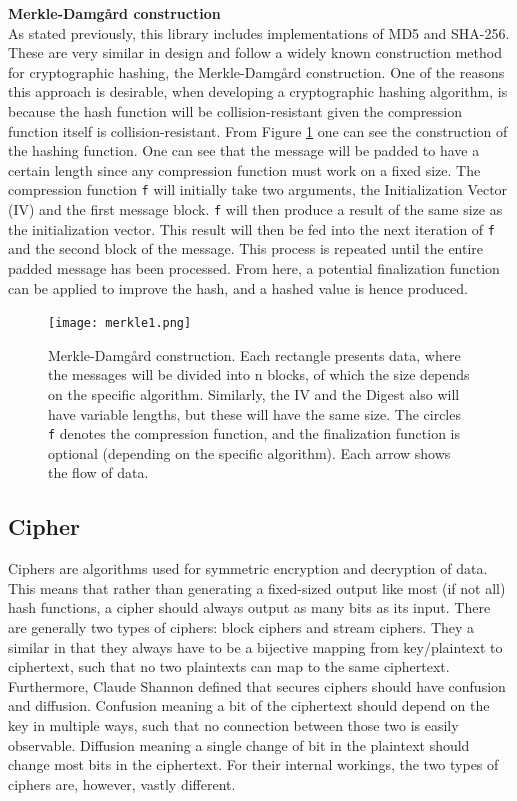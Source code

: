 \documentclass[a4paper, openany]{book}
\begin{document}
\textbf{Merkle-Damgård construction}\\
As stated previously, this library includes implementations of MD5 and SHA-256. These are very similar in design and follow a widely known construction method for cryptographic hashing, the Merkle-Damgård construction. One of the reasons this approach is desirable, when developing a cryptographic hashing algorithm, is because the hash function will be collision-resistant given the compression function itself is collision-resistant\cite{Merkle}.
From Figure \ref{fig:Merkle} one can see the construction of the hashing function. One can see that the message will be padded to have a certain length since any compression function must work on a fixed size. The compression function \texttt{f} will initially take two arguments, the Initialization Vector (IV) and the first message block. \texttt{f} will then produce a result of the same size as the initialization vector. This result will then be fed into the next iteration of \texttt{f} and the second block of the message. This process is repeated until the entire padded message has been processed. From here, a potential finalization function can be applied to improve the hash, and a hashed value is hence produced.

\begin{figure}[H]
\centering
\captionsetup{width=.8\linewidth}
\texttt{[image: merkle1.png]}
\caption[Merkle-Damgård construction]%
{Merkle-Damgård construction. Each rectangle presents data, where the messages will be divided into n blocks, of which the size depends on the specific algorithm. Similarly, the IV and the Digest also will have variable lengths, but these will have the same size. The circles \texttt{f} denotes the compression function, and the finalization function is optional (depending on the specific algorithm). Each arrow shows the flow of data. }
\label{fig:Merkle}
\end{figure}
\subsection{Cipher}
\label{sec:org10e66af}
\label{sec:cipher}
Ciphers are algorithms used for symmetric encryption and decryption of data. This means that rather than generating a fixed-sized output like most (if not all) hash functions, a cipher should always output as many bits as its input. There are generally two types of ciphers: block ciphers and stream ciphers. They a similar in that they always have to be a bijective mapping from key/plaintext to ciphertext, such that no two plaintexts can map to the same ciphertext. Furthermore, Claude Shannon defined\cite{Shannon} that secures ciphers should have confusion and diffusion. Confusion meaning a bit of the ciphertext should depend on the key in multiple ways, such that no connection between those two is easily observable. Diffusion meaning a single change of bit in the plaintext should change most bits in the ciphertext. For their internal workings, the two types of ciphers are, however, vastly different.\\
\end{document}
